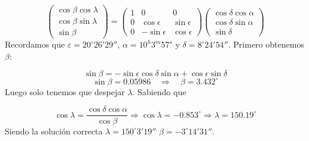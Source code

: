 \begin{equation}
	\begin{pmatrix}
		\cos \beta \cos \lambda \\
		\cos \beta \sin \lambda \\
		\sin \beta
	\end{pmatrix} =\begin{pmatrix}
		1 & 0              & 0             \\
		0 & \cos \epsilon  & \sin \epsilon \\
		0 & -\sin \epsilon & \cos \epsilon
	\end{pmatrix}
	\begin{pmatrix}
		\cos \delta \cos \alpha \\
		\cos \delta \sin \alpha \\
		\sin \delta
	\end{pmatrix}
\end{equation}
Recordamos que $\varepsilon=20^\circ 26' 29''$, $\alpha = 10^{h}3^{m}57^{s}$ y $\delta = 8^\circ24'54''$. Primero obtenemos $\beta$:

\begin{equation}
	\sin \beta = - \sin \epsilon \cos \delta \sin \alpha + \cos \epsilon \sin \delta
\end{equation}
\begin{equation}
	\sin \beta = 0.05986\quad \Longrightarrow \quad \beta = 3.432^\circ
\end{equation}
Luego solo tenemos que despejar $\lambda$. Sabiendo que

\begin{equation}
	\cos \lambda = \frac{\cos \delta \cos \alpha}{\cos \beta} \Rightarrow \cos \lambda = -0.853^\circ \Rightarrow \lambda = 150.19^\circ
\end{equation}
Siendo la solución correcta $\lambda = 150^\circ3'19''$	$\beta = -3^\circ14'31''$.


